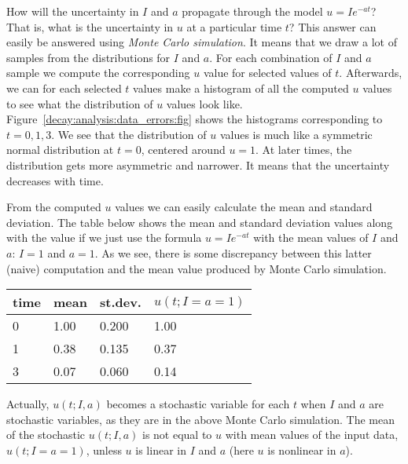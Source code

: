 \documentclass[graybox,sectrefs,envcountresetchap,open=right,final]{svmonodo}
\begin{document}
How will the uncertainty in $I$ and $a$ propagate through the model
$u=Ie^{-at}$? That is, what is the uncertainty in $u$ at a particular
time $t$? This answer can easily be answered using \emph{Monte Carlo
simulation}. It means that we draw a lot of samples from the
distributions for $I$ and $a$. For each combination of $I$ and $a$
sample we compute the corresponding $u$ value for selected values of
$t$.  Afterwards, we can for each selected $t$ values make a histogram
of all the computed $u$ values to see what the distribution of $u$
values look like. Figure~\ref{decay:analysis:data_errors:fig} shows the
histograms corresponding to $t=0,1,3$. We see that the distribution of
$u$ values is much like a symmetric normal distribution at $t=0$,
centered around $u=1$. At later times, the distribution gets more
asymmetric and narrower. It means that the uncertainty decreases with
time.

From the computed $u$ values we can easily calculate the mean and
standard deviation. The table below shows the mean and standard
deviation values along with the value if we just use the formula
$u=Ie^{-at}$ with the mean values of $I$ and $a$: $I=1$ and $a=1$. As
we see, there is some discrepancy between this latter (naive)
computation and the mean value produced by Monte Carlo simulation.



{\small   %

\vspace{4mm}

\begin{tabular}{llll}
\hline
\multicolumn{1}{c}{ time } & \multicolumn{1}{c}{ mean } & \multicolumn{1}{c}{ st.dev. } & \multicolumn{1}{c}{ $u(t;I=a=1)$ } \\
\hline
0    & 1.00 & 0.200   & 1.00         \\
1    & 0.38 & 0.135   & 0.37         \\
3    & 0.07 & 0.060   & 0.14         \\
\hline
\end{tabular}

\vspace{4mm}

}


\noindent
Actually, $u(t;I,a)$ becomes a stochastic variable for each $t$ when
$I$ and $a$ are stochastic variables, as they are in the above
Monte Carlo simulation. The mean of the stochastic $u(t;I,a)$ is
not equal to $u$ with mean values of the input data, $u(t;I=a=1)$,
unless $u$ is linear in $I$ and $a$ (here $u$ is nonlinear in $a$).
\end{document}
